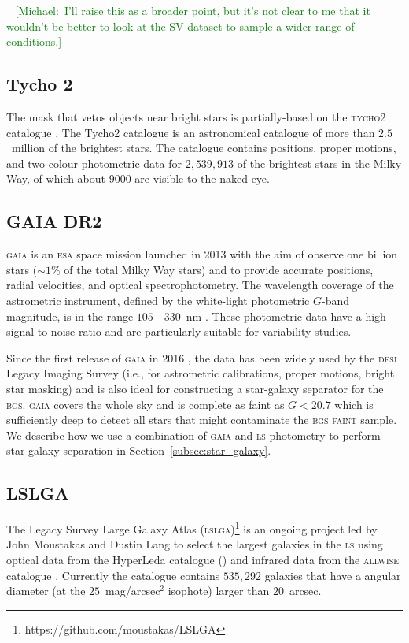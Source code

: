 \documentclass[fleqn,usenatbib]{mnras}
\newcommand{\mike}[1]{~\newline\noindent \textcolor{Green}{{ [Michael:~{#1}]\\}}}
\newcommand{\ALLWISE}{\textsc{allwise}\xspace}
\newcommand{\BGSF}{\textsc{bgs faint}\xspace}
\newcommand{\BGS}{\textsc{bgs}\xspace}
\newcommand{\DESI}{\textsc{desi}\xspace}
\newcommand{\ESA}{\textsc{esa}\xspace}
\newcommand{\GAIA}{\textsc{gaia}\xspace}
\newcommand{\LS}{\textsc{ls}\xspace}
\newcommand{\LSLGA}{\textsc{lslga}\xspace}
\newcommand{\Tycho}{\textsc{tycho2}\xspace}
\begin{document}
\mike{I'll raise this as a broader point, but it's not clear to me that it wouldn't be better to look at the SV dataset to sample a wider range of conditions.}

\subsection{Tycho 2}

The mask that vetos objects near bright stars is partially-based on the \Tycho catalogue \citep{2000A&A...355L..27H}. The Tycho2 catalogue is an astronomical catalogue of more than $2.5$~million of the brightest stars. The catalogue contains positions, proper motions, and two-colour photometric data for $2,539,913$ of the brightest stars in the Milky Way, of which about $9000$ are visible to the naked eye.

\subsection{GAIA DR2}\label{subsec:gaia}

\GAIA \citep{2016A&A...595A...1G} is an \ESA space mission launched in 2013 with the aim of observe one billion stars ($\sim 1 \%$ of the total Milky Way stars) and to provide accurate positions, radial velocities, and optical spectrophotometry. The wavelength coverage of the astrometric instrument, defined by the white-light photometric $G$-band magnitude, is in the range $105$ - $330$~nm \citep{2016A&A...595A...7C}. These photometric data have a high signal-to-noise ratio and are particularly  suitable  for  variability  studies.

Since the first release of \GAIA in 2016 \citep{2016A&A...595A...2G}, the data
has been widely used by the \DESI Legacy Imaging Survey (i.e., for astrometric calibrations, proper motions, bright star masking) and is also ideal for constructing a star-galaxy separator for the \BGS. 
\GAIA covers the whole sky and is complete as faint as $G < 20.7$ which is sufficiently deep to detect all stars that might contaminate the \BGSF sample. We describe how we use a combination of \GAIA and \LS photometry to perform star-galaxy separation in Section~\ref{subsec:star_galaxy}.

\subsection{LSLGA}\label{subsec:LSLGA}

The Legacy Survey Large Galaxy Atlas (\LSLGA)\footnote{https://github.com/moustakas/LSLGA} is an ongoing project led by John Moustakas and Dustin Lang to select the largest galaxies in the \LS using optical data from the HyperLeda catalogue (\citet{2014A&A...570A..13M}) and infrared data from the \ALLWISE catalogue \citep{2015ApJS..221...12S}. Currently the catalogue contains $535,292$ galaxies that have a angular diameter (at the $25$~mag/arcsec$^2$ isophote) larger than $20$~arcsec.
\end{document}
